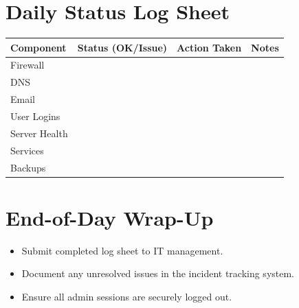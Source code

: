 \documentclass[12pt,a4paper]{article}
\begin{document}
\section{Daily Status Log Sheet}
\begin{longtable}{|p{3.5cm}|p{3.5cm}|p{3.5cm}|p{4cm}|}
\hline
\textbf{Component} & \textbf{Status (OK/Issue)} & \textbf{Action Taken} & \textbf{Notes} \\
\hline
Firewall & & & \\ \hline
DNS & & & \\ \hline
Email & & & \\ \hline
User Logins & & & \\ \hline
Server Health & & & \\ \hline
Services & & & \\ \hline
Backups & & & \\ \hline
\end{longtable}

\section{End-of-Day Wrap-Up}
\begin{itemize}[leftmargin=1.5em]
    \item Submit completed log sheet to IT management.
    \item Document any unresolved issues in the incident tracking system.
    \item Ensure all admin sessions are securely logged out.
\end{itemize}
\end{document}
